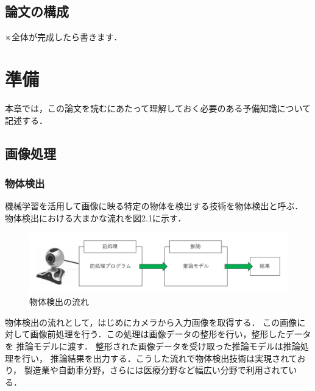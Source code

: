 \documentclass[11pt,a4j]{jreport}
\begin{document}
\section{論文の構成}
※全体が完成したら書きます．
%
\chapter{準備}
本章では，この論文を読むにあたって理解しておく必要のある予備知識について記述する．
\section{画像処理}
\subsection{物体検出}
機械学習を活用して画像に映る特定の物体を検出する技術を物体検出と呼ぶ．
物体検出における大まかな流れを図2.1に示す．
\begin{figure}[H]
  \center
  \includegraphics[scale = 0.8]{pict/pict4.jpg}
  \caption{物体検出の流れ}
\end{figure}
物体検出の流れとして，はじめにカメラから入力画像を取得する．
この画像に対して画像前処理を行う．この処理は画像データの整形を行い，整形したデータを
推論モデルに渡す．
整形された画像データを受け取った推論モデルは推論処理を行い，
推論結果を出力する．こうした流れで物体検出技術は実現されており，
製造業や自動車分野，さらには医療分野など幅広い分野で利用されている．
\end{document}
